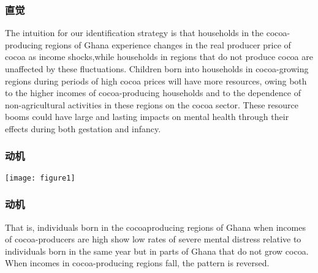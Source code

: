 \documentclass{beamer}
\begin{document}
\begin{frame}
	\frametitle{直觉}
	The intuition for our identiﬁcation strategy is that households in the cocoa-producing regions of Ghana experience changes in the real producer price of cocoa as income shocks,while households in regions that do not produce cocoa are unaﬀected by these ﬂuctuations. Children born into households in cocoa-growing regions during periods of high cocoa prices will have more resources, owing both to the higher incomes of cocoa-producing households and to the dependence of non-agricultural activities in these regions on the cocoa sector. These resource booms could have large and lasting impacts on mental health through their eﬀects during both gestation and infancy.
\end{frame}

\begin{frame}
	\frametitle{动机}
	\centering
	\texttt{[image: figure1]}
\end{frame}

\begin{frame}
	\frametitle{动机}
	That is, individuals born in the cocoaproducing regions of Ghana when incomes of cocoa-producers are high show low rates of severe mental distress relative to individuals born in the same year but in parts of Ghana that do not grow cocoa. When incomes in cocoa-producing regions fall, the pattern is reversed.
\end{frame}
\end{document}
